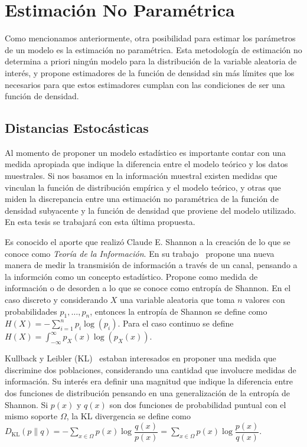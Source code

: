\section{Estimación No Paramétrica}

Como mencionamos anteriormente, otra posibilidad para estimar los parámetros de un modelo es la estimación no paramétrica. Esta metodología de estimación  no determina a priori ningún modelo para la distribución de la variable aleatoria de interés, y propone estimadores de la función de densidad sin más límites que los necesarios para que estos estimadores cumplan con las condiciones de ser una función de densidad.

\subsection{Distancias Estocásticas}

Al momento de proponer un modelo estadístico es importante contar con una medida apropiada que indique la diferencia entre el modelo teórico y los datos muestrales. Si nos basamos en la información muestral existen medidas que vinculan la función de distribución empírica y el modelo teórico, y otras que miden la discrepancia entre una estimación no paramétrica de la función de densidad subyacente y la función de densidad que proviene del modelo utilizado. En esta tesis se trabajará con esta última propuesta.

Es conocido el aporte que realizó Claude E. Shannon a la creaci\'on de lo que se conoce como \textit{Teoría de la Información}. En su trabajo~\cite{Shannon1948} propone una nueva manera de medir la transmisi\'on de informaci\'on a trav\'es de un canal, pensando a la informci\'on como un concepto estad\'istico. Propone como medida de informaci\'on o de desorden a lo que se conoce como entrop\'ia de Shannon. En el caso discreto y considerando $X$ una variable aleatoria que toma $n$ valores con probabilidades $p_1,\ldots,p_n$, entonces la entrop\'ia de Shannon se define como $H(X)=-\sum_{i=1}^n p_i \log(p_i)$. Para el caso continuo se define $H(X)=\int_{-\infty}^{\infty} p_X(x) \log(p_X(x)).$

Kullback y Leibler (KL)~\cite{KullbackLeibler1951} estaban interesados en proponer una medida que discrimine dos poblaciones, considerando una cantidad que involucre medidas de informaci\'on. Su inter\'es era definir una magnitud que indique la diferencia entre dos funciones de distribuci\'on pensando en una generalizaci\'on de la entrop\'ia de Shannon. Si $p(x)$ y $q(x)$ son dos funciones de probabilidad puntual con el mismo soporte $\Omega$, la KL divergencia se define como $D_{\text{KL}}(p \rVert q)=-\sum_{x \in \Omega} p(x) \log \dfrac{q(x)}{p(x)}=\sum_{x \in \Omega} p(x) \log\dfrac{p(x)}{q(x)}$. 

